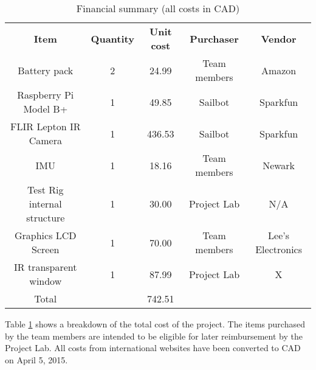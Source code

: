 
\begin{table}
\caption[Financial summary]{\label{tab:financialsummary}Financial summary (all costs in CAD)}
\begin{tabular}{c|c|c|c|c}
\textbf{Item} & \textbf{Quantity} & \textbf{Unit cost} & \textbf{Purchaser} & \textbf{Vendor}\\
Battery pack & 2 & 24.99 & Team members & Amazon\\
Raspberry Pi Model B+ & 1 & 49.85 & Sailbot & Sparkfun\\
FLIR Lepton IR Camera & 1 & 436.53 & Sailbot & Sparkfun\\
IMU & 1 & 18.16 & Team members & Newark\\
Test Rig internal structure & 1 & 30.00 & Project Lab & N/A\\
Graphics LCD Screen & 1 & 70.00 & Team members & Lee's Electronics\\
IR transparent window & 1 & 87.99 & Project Lab & X\\\hline
Total & & 742.51 & & \\

\end{tabular}
\end{table}

Table \ref{tab:financialsummary} shows a breakdown of the total cost of the project. The items purchased by the team members are intended to be eligible for later reimbursement by the Project Lab. All costs from international websites have been converted to CAD on April 5, 2015.
